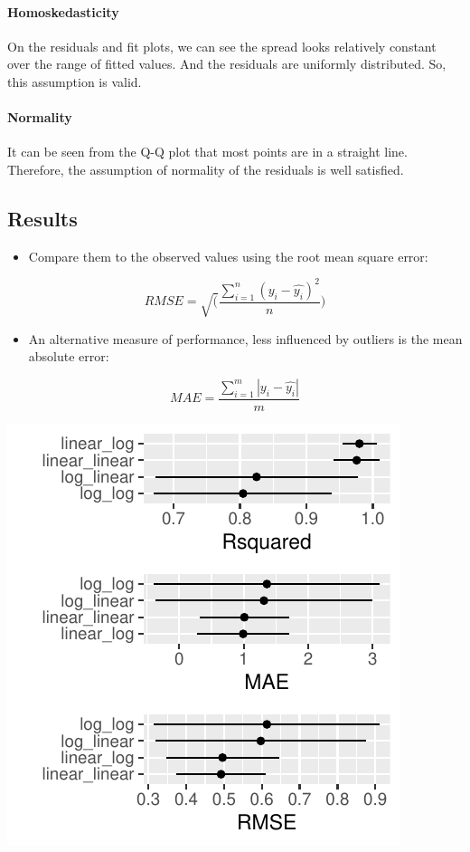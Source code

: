 \documentclass[letterpaper,9pt,twocolumn,twoside,]{pinp}
\providecommand{\tightlist}{%
  \setlength{\itemsep}{0pt}\setlength{\parskip}{0pt}}
\begin{document}
\hypertarget{homoskedasticity}{%
\paragraph{Homoskedasticity}\label{homoskedasticity}}

On the residuals and fit plots, we can see the spread looks relatively
constant over the range of fitted values. And the residuals are
uniformly distributed. So, this assumption is valid.

\hypertarget{normality}{%
\paragraph{Normality}\label{normality}}

It can be seen from the Q-Q plot that most points are in a straight
line. Therefore, the assumption of normality of the residuals is well
satisfied.

\hypertarget{results}{%
\subsection{Results}\label{results}}

\begin{itemize}
\tightlist
\item
  Compare them to the observed values using the root mean square error:
\end{itemize}

\[RMSE = \sqrt( \frac{\sum_{i=1}^n (y_i - \hat{y_i})^2 }{n} )\]

\begin{itemize}
\tightlist
\item
  An alternative measure of performance, less influenced by outliers is
  the mean absolute error:
\end{itemize}

\[MAE = \frac{\sum_{i=1}^m |y_i - \hat{y_i}|}{m}\]

\begin{center}\includegraphics{DATA2002-RE03E1_files/figure-latex/unnamed-chunk-19-1} \end{center}
\end{document}
